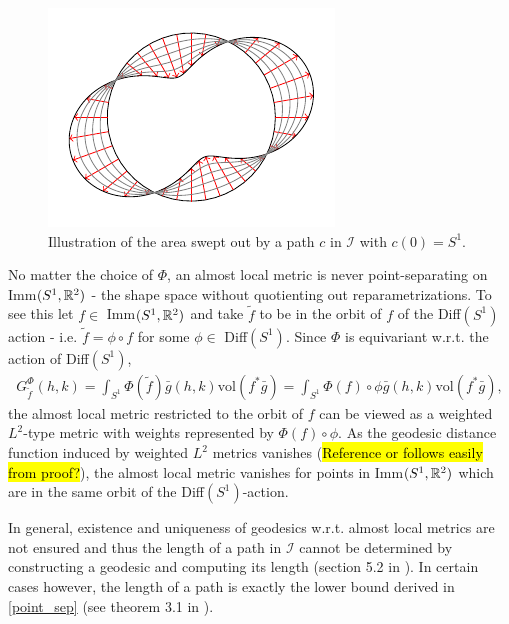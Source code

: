 \begin{figure}[h!]
  \centering
    \includegraphics[scale = 1]{deform_circle.pdf}
  \caption{Illustration of the area swept out by a path $c$ in $\mathcal{I}$ with $c(0) = S^1$.}
  \label{fig:area-swep}
\end{figure}

No matter the choice of $\Phi$, an almost local metric is never point-separating on Imm$(S^1, \mathbb{R}^2)$ - the shape space without quotienting out reparametrizations. To see this let $f \in$ Imm$(S^1, \mathbb{R}^2)$ and take $\tilde{f}$ to be in the orbit of $f$ of the Diff$(S^1)$ action - i.e. $\tilde{f} = \phi \circ f$ for some $\phi \in$ Diff$(S^1)$. Since $\Phi$ is equivariant w.r.t. the action of Diff$(S^1)$, 
\begin{align*}
G_{\tilde{f}}^\Phi (h,k) = \int_{S^1} \Phi(\tilde{f}) \bar{g}(h,k) \text{vol}(f^* \bar{g}) = \int_{S^1} \Phi(f) \circ \phi \bar{g}(h,k) \text{vol}(f^* \bar{g}),
\end{align*}
the almost local metric restricted to the orbit of $f$ can be viewed as a weighted $L^2$-type metric with weights represented by $\Phi(f) \circ \phi$. As the geodesic distance function induced by weighted $L^2$ metrics vanishes (\hl{Reference or follows easily from proof?}), the almost local metric vanishes for points in Imm$(S^1, \mathbb{R}^2)$ which are in the same orbit of the Diff$(S^1)$-action.

In general, existence and uniqueness of geodesics w.r.t. almost local metrics are not ensured and thus the length of a path in $\mathcal{I}$ cannot be determined by constructing a geodesic and computing its length (section 5.2 in \cite{bauer2014overview}). In certain cases however, the length of a path is exactly the lower bound derived in \ref{point_sep} (see theorem 3.1 in \cite{shah2007h0type}).

